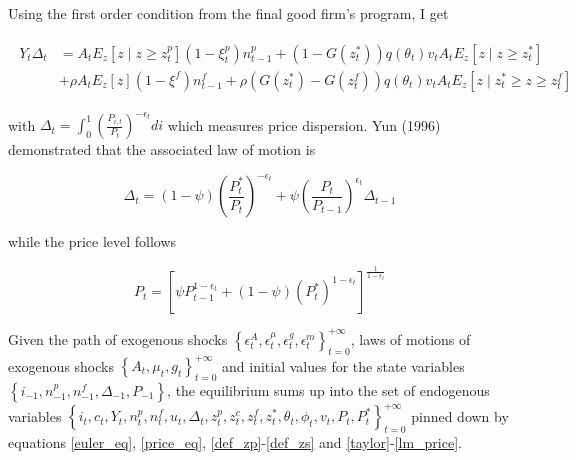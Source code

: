 \documentclass[a4paper]{article}
\begin{document}
Using the first order condition from the final good firm's program, I get

\begin{align}
\begin{split}
Y_t \Delta_t &= A_t E_z \left[z \mid z \geq z_t^p \right] \left( 1 - \xi_t^p \right) n_{t-1}^p + \left( 1 - G\left( z_t^* \right)\right) q \left( \theta_t \right) v_t A_t E_z \left[z \mid z \geq z_t^* \right]\\
&+ \rho A_t E_z \left[ z \right] \left( 1 - \xi^f \right) n_{t-1}^f + \rho \left( G\left( z_t^* \right) - G\left( z_t^f \right)\right) q \left( \theta_t \right) v_t A_t E_z \left[z \mid z_t^* \geq z \geq z_t^f \right] \label{res_cons_int}
\end{split}
\end{align}

with $\Delta_t = \int_{0}^{1} \left( \frac{P_{i,t}}{P_t}\right)^{-\epsilon_t} di$ which measures price dispersion. Yun (1996) \cite{yun1996nominal} demonstrated that the associated law of motion is

\begin{equation}
\Delta_t = (1-\psi) \left( \frac{P_t^*}{P_t} \right)^{-\epsilon_t} + \psi \left( \frac{P_t}{P_{t-1}} \right)^{\epsilon_t} \Delta_{t-1}
\end{equation}

while the price level follows

\begin{equation}
P_t = \left[ \psi P_{t-1}^{1-\epsilon_t} + (1-\psi) \left( P_t^* \right)^{1-\epsilon_t} \right]^{\frac{1}{1-\epsilon_t}} \label{lm_price}
\end{equation}

Given the path of exogenous shocks $\left\{ \epsilon_t^A, \epsilon_t^\mu, \epsilon_t^g, \epsilon_t^m \right\}_{t=0}^{+\infty}$, laws of motions of exogenous shocks $\left\{ A_t, \mu_t , g_t \right\}_{t=0}^{+\infty}$ and initial values for the state variables $\left\{ i_{-1}, n_{-1}^p, n_{-1}^f, \Delta_{-1}, P_{-1} \right\}$, the equilibrium sums up into the set of endogenous variables $\left\{ i_t, c_t, Y_t, n_t^p, n_t^f, u_t, \Delta_t, z_t^p, z_t^c, z_t^f, z_t^*, \theta_t, \phi_t, v_t, P_t, P_t^* \right\}_{t=0}^{+\infty}$ pinned down by equations \eqref{euler_eq}, \eqref{price_eq}, \eqref{def_zp}-\eqref{def_zs} and \eqref{taylor}-\eqref{lm_price}. 
\end{document}
